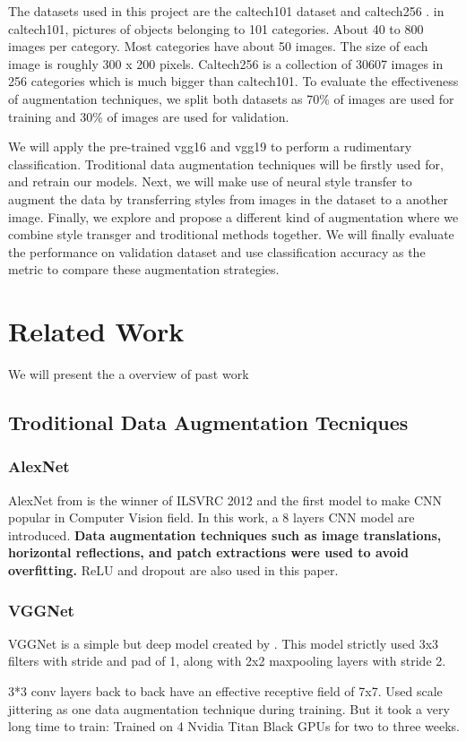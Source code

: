\documentclass[a4paper,11pt]{article}
\begin{document}
The datasets used in this project are the caltech101 dataset\cite{fei2006one} and caltech256 \cite{griffin2007caltech}. in caltech101, pictures of objects belonging to 101 categories. About 40 to 800 images per category. Most categories have about 50 images. The size of each image is roughly 300 x 200 pixels. Caltech256 is a collection of 30607 images in 256 categories which is much bigger than caltech101. To evaluate the effectiveness of augmentation techniques, we split both datasets as 70\% of images are used for training and 30\% of images are used for validation.

We will apply the pre-trained vgg16 and vgg19 to perform a rudimentary classification. Troditional data augmentation techniques will be firstly used for, and retrain our models. Next, we will make use of neural style transfer to augment the data by transferring styles from images in the dataset to a another image. Finally, we explore and propose a different kind of augmentation where we combine style transger and troditional methods together. We will finally evaluate the performance on validation dataset and use classification accuracy as the metric to compare these augmentation strategies.

\section{Related Work}
We will present the a overview of past work
\subsection{Troditional Data Augmentation Tecniques}
\subsubsection{AlexNet}
AlexNet from \cite{krizhevsky2012imagenet} is the winner of ILSVRC 2012 and the first model to make CNN popular in Computer Vision field. In this work, a 8 layers CNN model are introduced. \textbf{Data augmentation techniques such as image translations, horizontal reflections, and patch extractions were used to avoid overfitting.} ReLU and dropout are also used in this paper.
\subsubsection{VGGNet}
VGGNet is a simple but deep model created by \cite{simonyan2014very}. This model strictly used 3x3 filters with stride and pad of 1, along with 2x2 maxpooling layers with stride 2.
\begin{outline}
 3*3 conv layers back to back have an effective receptive field of 7x7.
\1 Used scale jittering as one data augmentation technique during training.
\1 But it took a very long time to train: Trained on 4 Nvidia Titan Black GPUs for two to three weeks.
\end{outline}
\end{document}
